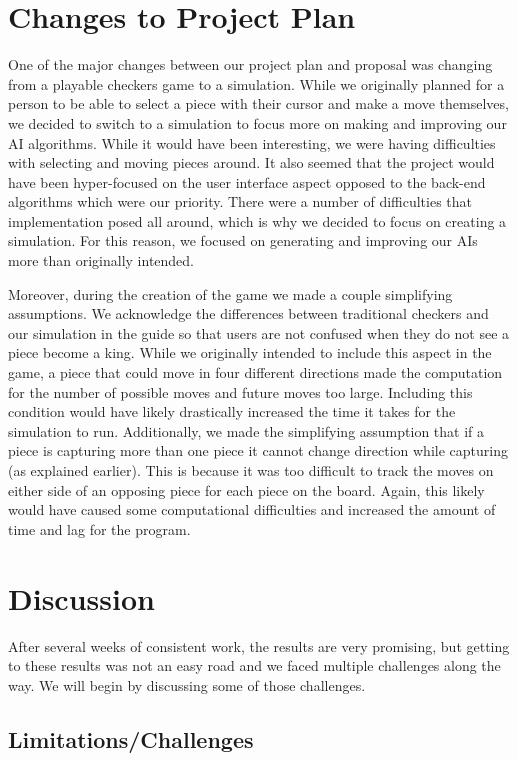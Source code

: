 \documentclass[fontsize=11pt]{article}
\begin{document}
\section*{Changes to Project Plan}

One of the major changes between our project plan and proposal was changing from a playable checkers game to a simulation. While we originally planned for a person to be able to select a piece with their cursor and make a move themselves, we decided to switch to a simulation to focus more on making and improving our AI algorithms. While it would have been interesting, we were having difficulties with selecting and moving pieces around. It also seemed that the project would have been hyper-focused on the user interface aspect opposed to the back-end algorithms which were our priority. There were a number of difficulties that implementation posed all around, which is why we decided to focus on creating a simulation. For this reason, we focused on generating and improving our AIs more than originally intended.

Moreover, during the creation of the game we made a couple simplifying assumptions. We acknowledge the differences between traditional checkers and our simulation in the guide so that users are not confused when they do not see a piece become a king. While we originally intended to include this aspect in the game, a piece that could move in four different directions made the computation for the number of possible moves and future moves too large. Including this condition would have likely drastically increased the time it takes for the simulation to run. Additionally, we made the simplifying assumption that if a piece is capturing more than one piece it cannot change direction while capturing (as explained earlier). This is because it was too difficult to track the moves on either side of an opposing piece for each piece on the board. Again, this likely would have caused some computational difficulties and increased the amount of time and lag for the program.

\section*{Discussion}

After several weeks of consistent work, the results are very promising, but getting to these results was not an easy road and we faced multiple challenges along the way. We will begin by discussing some of those challenges.

\subsection*{Limitations/Challenges}
\end{document}
